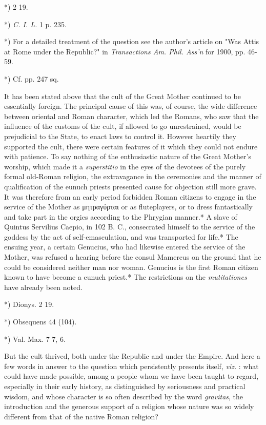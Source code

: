 \documentclass[a4paper, 11pt, oneside, polutonikogreek, english]{article}
\begin{document}
*) 2 19.

*) \emph{C. I. L.} 1 p. 235.

*) For a detailed treatment of the question see the author's article on "Was Attis at Rome under the Republic?" in \emph{Transactions Am. Phil. Ass'n} for 1900, pp. 46-59.

*) Cf. pp. 247 sq.

It has been stated above that the cult of the Great Mother continued to be essentially foreign. The principal cause of this was, of course, the wide difference between oriental and Roman character, which led the Romans, who saw that the influence of the customs of the cult, if allowed to go unrestrained, would be prejudicial to the State, to enact laws to control it. However heartily they supported the cult, there were certain features of it which they could not endure with patience. To say nothing of the enthusiastic nature of the Great Mother's worship, which made it a \emph{superstitio} in the eyes of the devotees of the purely formal old-Roman religion, the extravagance in the ceremonies and the manner of qualification of the eunuch priests presented cause for objection still more grave. It was therefore from an early period forbidden Roman citizens to engage in the service of the Mother as μητραγύρται or as fluteplayers, or to dress fantastically and take part in the orgies according to the Phrygian manner.* A slave of Quintus Servilius Caepio, in 102 B. C., consecrated himself to the service of the goddess by the act of self-emasculation, and was transported for life.* The ensuing year, a certain Genucius, who had likewise entered the service of the Mother, was refused a hearing before the consul Mamercus on the ground that he could be considered neither man nor woman. Genucius is the first Roman citizen known to have become a eunuch priest.* The restrictions on the \emph{mutitationes} have already been noted.

*) Dionys. 2 19.

*) Obsequens 44 (104).

*) Val. Max. 7 7, 6.

But the cult thrived, both under the Republic and under the Empire. And here a few words in answer to the question which persistently presents itself, \emph{viz.} : what could have made possible, among a people whom we have been taught to regard, especially in their early history, as distinguished by seriousness and practical wisdom, and whose character is so often described by the word \emph{gravitas}, the introduction and the generous support of a religion whose nature was so widely different from that of the native Roman religion?
\end{document}
